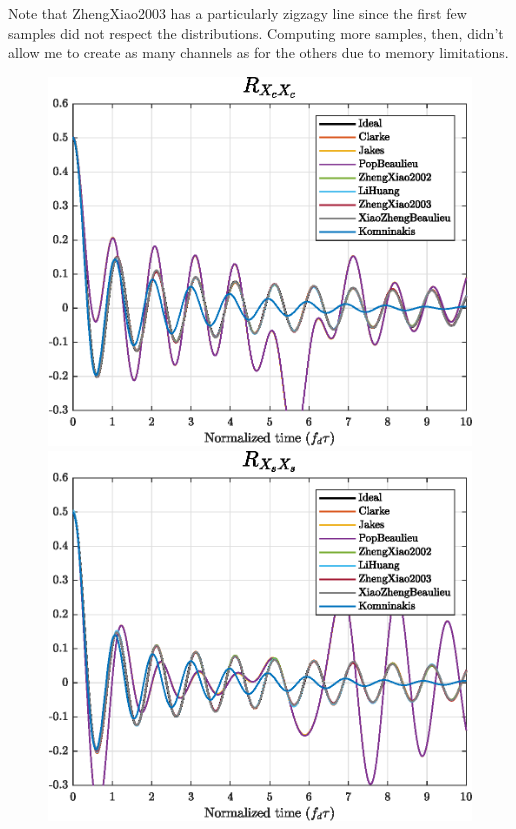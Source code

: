 Note that ZhengXiao2003 has a particularly zigzagy line since the first few samples did not respect the distributions. Computing more samples, then, didn't allow me to create as many channels as for the others due to memory limitations.


\begin{figure}
	\hfill
	\begin{minipage}{.45\linewidth}
		\includegraphics[width=\linewidth]{img/XcXc.eps}
	\end{minipage}
	\hfill
	\begin{minipage}{.45\linewidth}
		\includegraphics[width=\linewidth]{img/XsXs.eps}
	\end{minipage}
	\hfill
	

\end{figure}
